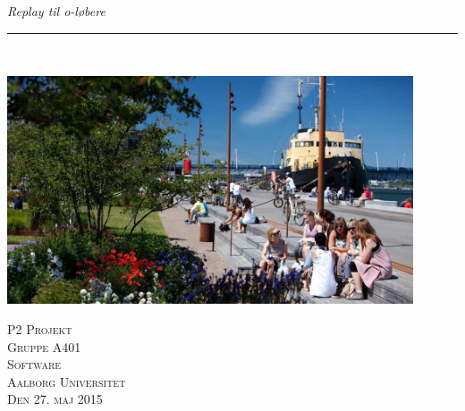 \thispagestyle{empty}
\begin{flushright}
\vspace{3cm}

\phantom{hul}

\phantom{hul}

\phantom{hul}

\textsl{\Huge Replay til o-løbere} \\ \vspace{1cm}

\rule{13cm}{3mm} \\ \vspace{1.5cm}
\vspace{1cm}

\includegraphics[width=0.90\textwidth]{billeder/aalborghavnefront}
\vspace{4cm}

\vspace{2cm} 
\textsc{\Large P2 Projekt \\
Gruppe A401 \\
Software\\
Aalborg Universitet\\
Den 27. maj 2015\\}
\end{flushright}

